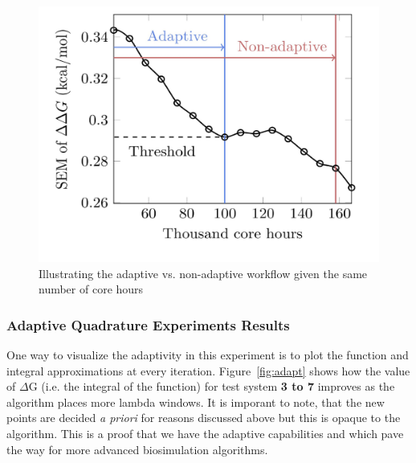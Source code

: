 
\begin{figure}
  \centering
    \includegraphics[width=\columnwidth]{figures/adaptive_vs_nonadaptive_pseudo.pdf}
    \caption{Illustrating the adaptive vs. non-adaptive workflow given the
    same number of core hours}
\label{fig:adaptive_vs_nonadaptive_TIES}
\end{figure}

\subsubsection{Adaptive Quadrature Experiments Results}


One way to visualize the adaptivity in this experiment is to plot the
function and integral approximations at every iteration.
Figure~\ref{fig:adapt} shows how the value of $\Delta$G (i.e. the integral of
the function) for test system \textbf{3 to 7} improves as the algorithm
places more lambda windows. It is imporant to note, that the new points are
decided {\it a priori} for reasons discussed above but this is opaque to the
algorithm. This is a proof that we have the adaptive capabilities and which
pave the way for more advanced biosimulation algorithms.

